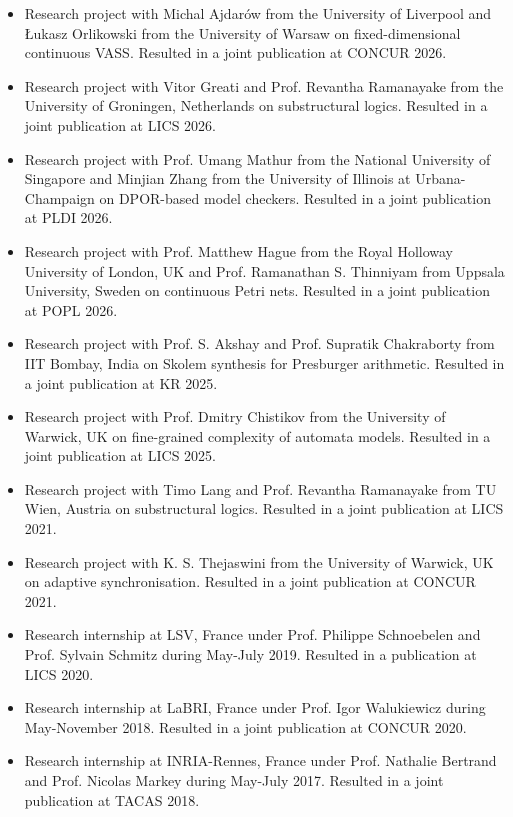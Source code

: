 \documentclass[11pt,a4paper,sans]{moderncv}        %
\begin{document}
\begin{itemize}
	\setlength{\itemsep}{2pt}
	\item Research project with Michal Ajdarów from the University of Liverpool and Łukasz Orlikowski from the University of Warsaw on fixed-dimensional continuous VASS. Resulted in a joint publication at CONCUR 2026.
	\item Research project with Vitor Greati and Prof. Revantha Ramanayake from the University of Groningen, Netherlands on substructural logics. Resulted in a joint publication at LICS 2026.
	\item Research project with Prof. Umang Mathur from the National University of Singapore and Minjian Zhang from the University of Illinois at Urbana-Champaign on DPOR-based model checkers. Resulted in a joint publication at PLDI 2026.
	\item Research project with Prof. Matthew Hague from the Royal Holloway University of London, UK and Prof. Ramanathan S. Thinniyam from Uppsala University, Sweden on continuous Petri nets. Resulted in a joint publication at POPL 2026.
	\item Research project with Prof. S. Akshay and Prof. Supratik Chakraborty from IIT Bombay, India on Skolem synthesis for Presburger arithmetic. Resulted in a joint publication at KR 2025.
	\item Research project with Prof. Dmitry Chistikov from the University of Warwick, UK on 
	fine-grained complexity of automata models. Resulted in a joint publication at LICS 2025.
	\item Research project with Timo Lang and Prof. Revantha Ramanayake from TU Wien, Austria on
	substructural logics. Resulted in a joint publication at LICS 2021.
	\item Research project with K. S. Thejaswini from the University of Warwick, UK on adaptive synchronisation. Resulted in a joint publication at CONCUR 2021.
	\item Research internship at LSV, France under Prof. Philippe Schnoebelen and Prof. Sylvain Schmitz
	during May-July 2019.
	Resulted in a publication at LICS 2020.
	\item Research internship at LaBRI, France under Prof. Igor Walukiewicz during May-November 2018.
	Resulted in a joint publication at CONCUR 2020.
	\item Research internship at INRIA-Rennes, France under Prof. Nathalie Bertrand and Prof. Nicolas Markey during May-July 2017.
	Resulted in a joint publication at TACAS 2018.
\end{itemize}
\end{document}
